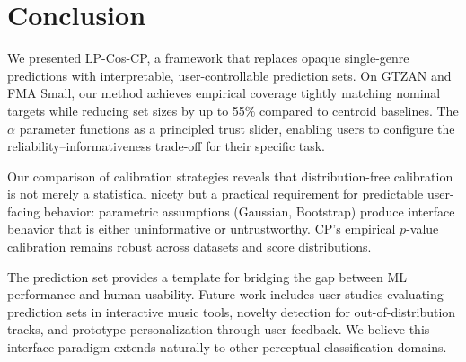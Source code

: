 
\section{Conclusion}
\label{sec:conclusion}

We presented LP-Cos-CP, a framework that replaces opaque single-genre
predictions with interpretable, user-controllable prediction sets. On GTZAN and
FMA Small, our method achieves empirical coverage tightly matching nominal
targets while reducing set sizes by up to 55\% compared to centroid
baselines. The $\alpha$ parameter functions as a principled trust slider,
enabling users to configure the reliability--informativeness trade-off for their
specific task.

Our comparison of calibration strategies reveals that distribution-free
calibration is not merely a statistical nicety but a practical requirement for
predictable user-facing behavior: parametric assumptions (Gaussian,
Bootstrap) produce interface behavior that is either uninformative or
untrustworthy. CP's empirical $p$-value calibration remains robust across
datasets and score distributions.

The prediction set provides a template for bridging the gap between ML
performance and human usability. Future work includes user studies evaluating
prediction sets in interactive music tools, novelty detection for
out-of-distribution tracks, and prototype personalization through user feedback.
We believe this interface paradigm extends naturally to other perceptual
classification domains.
